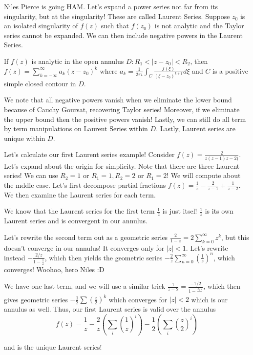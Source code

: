 \documentclass[10pt]{report}
\newcommand{\abs}[1]{\left|#1\right|}
\begin{document}
Niles Pierce is going HAM. Let's expand a power series not far from its singularity, but at the singularity! These are called Laurent Series. Suppose $z_0$ is an isolated singularity of $f(z)$ such that $f(z_0)$ is not analytic and the Taylor series cannot be expanded. We can then include negative powers in the Laurent Series.

If $f(z)$ is analytic in the open annulus $D: R_1 < |z-z_0| < R_2$, then $f(z) = \sum_{k=-\infty}^{\infty}a_k(z-z_0)^k$ where $a_k = \frac{1}{2\pi i} \int_C \frac{f(\xi)}{(\xi-z_0)^{k+1}}d\xi$ and $C$ is a positive simple closed contour in $D$.

We note that all negative powers vanish when we eliminate the lower bound because of Cauchy Goursat, recovering Taylor series! Moreover, if we eliminate the upper bound then the positive powers vanish! Lastly, we can still do all term by term manipulations on Laurent Series within $D$. Lastly, Laurent series are unique within $D$. 

Let's calculate our first Laurent series example! Consider $f(z) = \frac{2}{z(z-1)z-2)}$. Let's expand about the origin for simplicity. Note that there are three Laurent series! We can use $R_2 = 1$ or $R_1 = 1, R_2 = 2$ or $R_1 = 2$! We will compute about the mddle case. Let's first decompose partial fractions $f(z) = \frac{1}{z} - \frac{2}{z-1} + \frac{1}{z-2}$. We then examine the Laurent series for each term.

We know that the Laurent series for the first term $\frac{1}{z}$ is just itsel! $\frac{1}{z}$ is its own Laurent series and is convergent in our annulus.

Let's rewrite the second term out as a geometric series $\frac{2}{1-z} = 2\sum_{k=0}^{\infty} z^{k}$, but this doesn't converge in our annulus! It converges only for $\abs{z} < 1$. Let's rewrite instead $-\frac{2/z}{1-\frac{1}{z}}$, which then yields the geometric series $-\frac{2}{z}\sum_{n=0}^{\infty}\left( \frac{1}{z} \right)^n$, which converges! Woohoo, hero Niles :D

We have one last term, and we will use a similar trick $\frac{1}{z-2} = \frac{-1/2}{1-\frac{z/2}{}}$, which then gives geometric series $-\frac{1}{2}\sum \left( \frac{z}{2} \right)^k$ which converges for $\abs{z} < 2$ which is our annulus as well. Thus, our first Laurent series is valid over the annulus
$$f(z) = \frac{1}{z} - \frac{2}{z}\left( \sum_i \left( \frac{1}{z} \right)^i \right) - \frac{1}{2}\left( \sum_i\left( \frac{z}{2} \right)^i \right)$$

and is the unique Laurent series!
\end{document}
